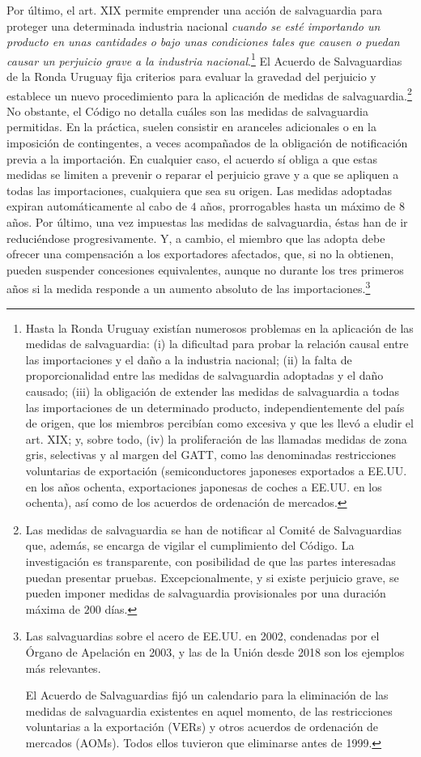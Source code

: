 \documentclass[10pt,a4paper]{article}
\begin{document}
Por último, el art. XIX permite emprender una acción de salvaguardia para proteger una determinada industria nacional \textit{cuando se esté importando un producto en unas cantidades o bajo unas condiciones tales que causen o puedan causar un perjuicio grave a la industria nacional}.\footnote{%
  Hasta la Ronda Uruguay existían numerosos problemas en la aplicación de las medidas de salvaguardia: (i) la dificultad para probar la relación causal entre las importaciones y el daño a la industria nacional; (ii) la falta de proporcionalidad entre las medidas de salvaguardia adoptadas y el daño causado; (iii) la obligación de extender las medidas de salvaguardia a todas las importaciones de un determinado producto, independientemente del país de origen, que los miembros percibían como excesiva y que les llevó a eludir el art. XIX; y, sobre todo, (iv) la proliferación de las llamadas medidas de zona gris, selectivas y al margen del GATT, como las denominadas restricciones voluntarias de exportación (semiconductores japoneses exportados a EE.UU. en los años ochenta, exportaciones japonesas de coches a EE.UU. en los ochenta), así como de los acuerdos de ordenación de mercados.
} El Acuerdo de Salvaguardias de la Ronda Uruguay fija criterios para evaluar la gravedad del perjuicio y establece un nuevo procedimiento para la aplicación de medidas de salvaguardia.\footnote{%
  Las medidas de salvaguardia se han de notificar al Comité de Salvaguardias que, además, se encarga de vigilar el cumplimiento del Código. La investigación es transparente, con posibilidad de que las partes interesadas puedan presentar pruebas. Excepcionalmente, y si existe perjuicio grave, se pueden imponer medidas de salvaguardia provisionales por una duración máxima de $200$ días. 
} No obstante, el Código no detalla cuáles son las medidas de salvaguardia permitidas. En la práctica, suelen consistir en aranceles adicionales o en la imposición de contingentes, a veces acompañados de la obligación de notificación previa a la importación. En cualquier caso, el acuerdo sí obliga a que estas medidas se limiten a prevenir o reparar el perjuicio grave y a que se apliquen a todas las importaciones, cualquiera que sea su origen. Las medidas adoptadas expiran automáticamente al cabo de $4$ años, prorrogables hasta un máximo de $8$ años. Por último, una vez impuestas las medidas de salvaguardia, éstas han de ir reduciéndose progresivamente. Y, a cambio, el miembro que las adopta debe ofrecer una compensación a los exportadores afectados, que, si no la obtienen, pueden suspender concesiones equivalentes, aunque no durante los tres primeros años si la medida responde a un aumento absoluto de las importaciones.\footnote{%
  Las salvaguardias sobre el acero de EE.UU. en 2002, condenadas por el Órgano de Apelación en 2003, y las de la Unión desde 2018 son los ejemplos más relevantes.

  El Acuerdo de Salvaguardias fijó un calendario para la eliminación de las medidas de salvaguardia existentes en aquel momento, de las restricciones voluntarias a la exportación (VERs) y otros acuerdos de ordenación de mercados (AOMs). Todos ellos tuvieron que eliminarse antes de 1999.
}
\end{document}
